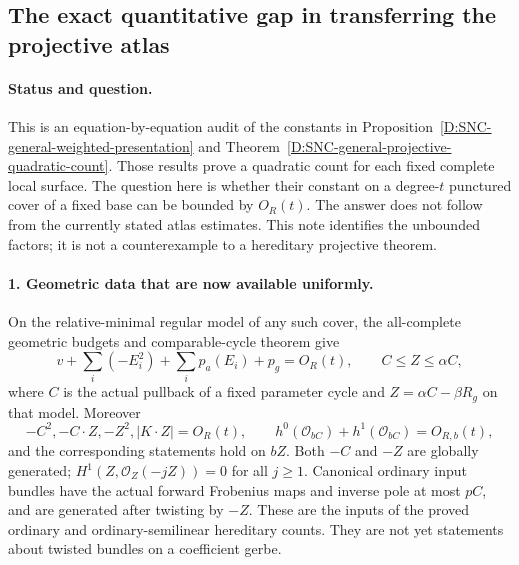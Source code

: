\subsection{The exact quantitative gap in transferring the projective atlas}

\paragraph{Status and question.}
This is an equation-by-equation audit of the constants in
Proposition~\ref{D:SNC-general-weighted-presentation} and
Theorem~\ref{D:SNC-general-projective-quadratic-count}.
Those results prove a quadratic count for each fixed complete
local surface. The question here is whether their constant on
a degree-$t$ punctured cover of a fixed base can be bounded by
$O_R(t)$. The answer does not follow from the currently stated
atlas estimates. This note identifies the unbounded factors;
it is not a counterexample to a hereditary projective theorem.

\paragraph{1. Geometric data that are now available uniformly.}
On the relative-minimal regular model of any such cover, the
all-complete geometric budgets and comparable-cycle theorem give
\[
 v+\sum_i(-E_i^2)+\sum_i p_a(E_i)+p_g=O_R(t),\qquad
 C\le Z\le\alpha C,                                      \tag{D.HP.1}
\]
where $C$ is the actual pullback of a fixed parameter cycle and
$Z=\alpha C-\beta R_g$ on that model. Moreover
\[
 -C^2,-C\cdot Z,-Z^2,|K\cdot Z|=O_R(t),\qquad
 h^0(\mathcal O_{bC})+h^1(\mathcal O_{bC})=O_{R,b}(t),       \tag{D.HP.2}
\]
and the corresponding statements hold on $bZ$.
Both $-C$ and $-Z$ are globally generated;
$H^1(Z,\mathcal O_Z(-jZ))=0$ for all $j\ge1$.
Canonical ordinary input bundles have the actual forward
Frobenius maps and inverse pole at most $pC$, and are generated
after twisting by $-Z$. These are the inputs of the proved
ordinary and ordinary-semilinear hereditary counts. They are
not yet statements about twisted bundles on a coefficient gerbe.

